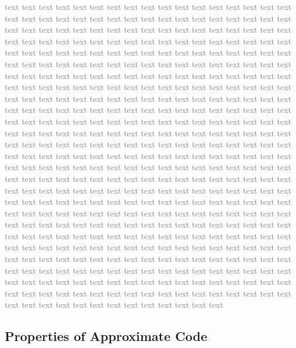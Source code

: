 \documentclass[sigconf]{acmart}
\begin{document}
\textcolor{gray}{
    text text text text text text text text text text text text text text text text text text text text text text text text text text text text text text text text text text text text text text text text text text text text text text text text text text text text text text text text text text text text text text text text text text text text text text text text text text text text text text text text text text text text text text text text text text text text text text text text text text text text text text text text text text text text text text text text text text text text text text text text text text text text text text text text text text text text text text text text text text text text text text text text text text text text text text text text text text text text text text text text text text text text text text text text text text text text text text text text text text text text text text text text text text text text text text text text text text text text text text text text text text text text text text text text text text text text text text text text text text text text text text text text text text text text text text text text text text text text text text text text text text text text text text text text text text text text text text text text text text text text text text text text text text text text text text text text text text text text text text text text text text text text text text text text text text text text text text text text text text text text text text text text text text text text text text text text text text text text text text text text text text text text text text text text text text text text text text text text text text text text text text text text text text text text text text text text text text text text text text text text text text text text text text text text text text text text text text text text text text text text text text text text text text text text text text text text text text text text text text text text text text text text text text text text text text text text text text text text text text text text text text text text text text text text text text text text text text text text text text text text text text text text text text text text text text text text text text text 
}

\subsection{Properties of Approximate Code}
\end{document}
